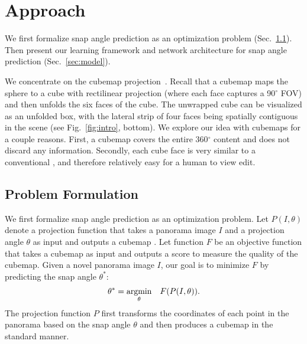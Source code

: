 \vspace*{-0.1in}
\section{Approach} \label{sec:approach}
\vspace*{-0.05in}
We first formalize  snap angle prediction as an optimization problem (Sec.~\ref{sec:snap_angle}). Then present our learning framework and network architecture for snap angle prediction (Sec.~\ref{sec:model}).

We concentrate on the cubemap projection~\cite{greene1986environment}.
Recall that a cubemap maps the sphere to a cube with rectilinear projection (where each face captures a 90$^{\circ}$ FOV) and then unfolds the six faces of the cube.  The unwrapped cube can be visualized as an unfolded box, with the lateral strip of four faces being spatially contiguous in the scene (see Fig.~\ref{fig:intro}, bottom).  We explore our idea with cubemaps for a couple reasons.  First, a cubemap covers the entire 360$^{\circ}$ content and does not discard any information.  Secondly, each cube face is very similar to a conventional 
, and therefore relatively easy for a human to view  edit.


\vspace*{-0.05in}
\subsection{Problem Formulation}\label{sec:snap_angle}

We first formalize snap angle prediction as an optimization problem.  %
Let $P(I,\theta)$ denote a projection function that takes a panorama image $I$ and a projection angle $\theta$ as input and outputs a cubemap . Let function $F$ be an objective function that takes a cubemap as input and outputs a score to measure the quality of the cubemap. Given a novel panorama image $I$, our goal is to minimize $F$ by predicting the snap angle $\theta^\ast$:
\begin{equation}
\begin{matrix}
\displaystyle \textcolor{black}{\theta^\ast}  = \operatorname*{argmin}_\theta & F(P(I,\theta)).  \\
\end{matrix}
\end{equation}
The projection function $P$ first transforms the coordinates of each point in the panorama based on the snap angle $\theta$ and then produces a cubemap in the standard manner.

